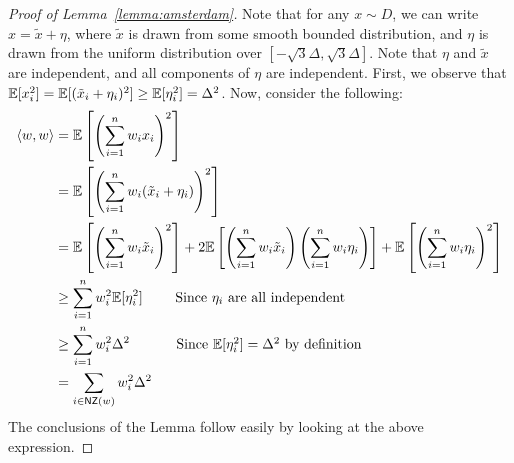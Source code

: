 \begin{proof}[Proof of Lemma~\ref{lemma:amsterdam}]
Note that for any $x \sim D$, we can write $x = \tilde{x} + \eta$, where
$\tilde{x}$ is drawn from some smooth bounded distribution, and $\eta$ is drawn
from the uniform distribution over $[-\sqrt{3} \Delta, \sqrt{3} \Delta]$. Note
that $\eta$ and $\tilde{x}$ are independent, and all components of $\eta$ are
independent. First, we observe that $\mathbb{E}[x_i^2] = \mathbb{E}[(\tilde{x}_i + \eta_i)^2]
\geq \mathbb{E}[\eta_i^2] = \Delta^2$. Now, consider the following:
\begin{align*}
\langle w, w \rangle &= \mathbb{E}\left[\left(\sum_{i=1}^n w_i x_i\right)^2\right] \\
&= \mathbb{E}\left[\left(\sum_{i = 1}^n w_i (\tilde{x}_i + \eta_i) \right)^2 \right] \\ 
&= \mathbb{E}\left[\left(\sum_{i=1}^n w_i \tilde{x}_i\right)^2\right] +
2\mathbb{E}\left[\left(\sum_{i=1}^n w_i \tilde{x}_i \right)\left(\sum_{i=1}^n w_i
\eta_i\right) \right] + \mathbb{E}\left[\left(\sum_{i=1}^n w_i \eta_i\right)^2\right] \\
&\geq \sum_{i=1}^n w_i^2 \mathbb{E}[\eta_i^2] \mbox{~~~~~~~Since $\eta_i$ are all independent}
\\
&\geq \sum_{i = 1}^n w_i^2 \Delta^2  \mbox{~~~~~~~~~~Since $\mathbb{E}[\eta_i^2] = \Delta^2$ by
definition} \\
&= \sum_{i \in \mathsf{NZ}(w)} w_i^2 \Delta^2
\end{align*}
The conclusions of the Lemma follow easily by looking at the above expression.
\end{proof}
